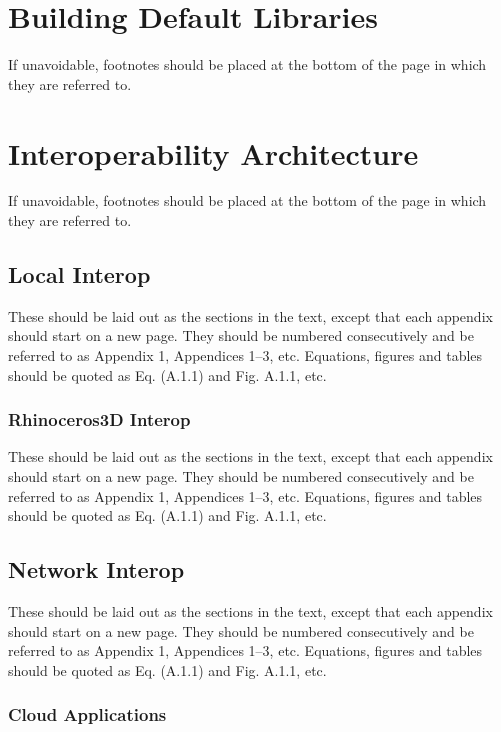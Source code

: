 \documentclass[aps,prb,twocolumn,superscriptaddress,floatfix,longbibliography]{revtex4-2}
\begin{document}
\section{Building Default Libraries}

If unavoidable, footnotes should be placed at the bottom
of the page in which they are referred to.

\section{Interoperability Architecture}

If unavoidable, footnotes should be placed at the bottom
of the page in which they are referred to.

\subsection{Local Interop}

These should be laid out as the sections in the text,
except that each appendix should start on a new page.
They should be numbered consecutively and be referred
to as Appendix 1, Appendices 1--3, etc. 
Equations, figures and tables should be
quoted as Eq. (A.1.1) and Fig. A.1.1, etc.  

\subsubsection{Rhinoceros3D Interop}

These should be laid out as the sections in the text,
except that each appendix should start on a new page.
They should be numbered consecutively and be referred
to as Appendix 1, Appendices 1--3, etc. 
Equations, figures and tables should be
quoted as Eq. (A.1.1) and Fig. A.1.1, etc.  

\subsection{Network Interop}

These should be laid out as the sections in the text,
except that each appendix should start on a new page.
They should be numbered consecutively and be referred
to as Appendix 1, Appendices 1--3, etc. 
Equations, figures and tables should be
quoted as Eq. (A.1.1) and Fig. A.1.1, etc.  

\subsubsection{Cloud Applications}
\end{document}
